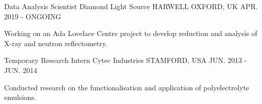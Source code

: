 \begin{cventries}
  \cventry
    {Data Analysis Scientist}
    {Diamond Light Source}
    {HARWELL OXFORD, UK}
    {APR. 2019 - ONGOING}
    {
      \begin{cvitems}
        \item {Working on an Ada Lovelace Centre project to develop reduction and analysis of X-ray and neutron reflectometry.}
      \end{cvitems}
    }
  \cventry
    {Temporary Research Intern}
    {Cytec Industries}
    {STAMFORD, USA}
    {JUN. 2013 - JUN. 2014}
    {
      \begin{cvitems}
        \item {Conducted research on the functionalisation and application of polyelectrolyte emulsions.}
      \end{cvitems}
    }
\end{cventries}
